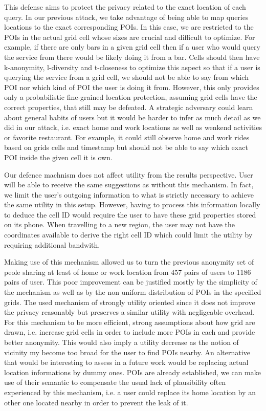 \documentclass[10pt,conference,compsocconf]{IEEEtran}
\begin{document}
This defense aims to protect the privacy related to the exact location of each query. In our previous attack, we take advantage of being able to map queries locations to the exact corresponding POIs. In this case, we are restricted to the POIs in the actual grid cell whose sizes are crucial and difficult to optimize. For example, if there are only bars in a given grid cell then if a user who would query the service from there would be likely doing it from a bar. Cells should then have k-anonymity, l-diversity and t-closeness to optimize this aspect so that if a user is querying the service from a grid cell, we should not be able to say from which POI nor which kind of POI the user is doing it from. However, this only provides only a probabilistic fine-grained location protection, assuming grid cells have the correct properties, that still may be defeated. A strategic adversary could learn about general habits of users but it would be harder to infer as much detail as we did in our attack, i.e. exact home and work locations as well as wenkend activities or favorite restaurant. For example, it could still observe home and work rides based on grids cells and timestamp but should not be able to say which exact POI inside the given cell it is own.

Our defence machnism does not affect utility from the results perspective. User will be able to receive the same suggestions as without this mechanism. In fact, we limit the user's outgoing information to what is strictly necessary to achieve the same utility in this setup. However, having to process this information locally to deduce the cell ID would require the user to have these grid properties stored on its phone. When travelling to a new region, the user may not have the coordinates available to derive the right cell ID which could limit the utility by requiring additional bandwith.

Making use of this mechanism allowed us to turn the previous anonymity set of peole sharing at least of home or work location from 457 pairs of users to 1186 pairs of user. This poor improvement can be justified mostly by the simplicity of the mechanism as well as by the non uniform distribution of POIs in the specified grids. The used mechanism of strongly utility oriented since it does not improve the privacy reasonably but preserves a similar utility with negligeable overhead. For this mechanism to be more efficient, strong assumptions about how grid are drawn, i.e. increase grid cells in order to include more POIs in each and provide better anonymity. This would also imply a utility decrease as the notion of vicinity my become too broad for the user to find POIs nearby. An alternative that would be interesting to assess in a future work would be replacing actual location informations by dummy ones. POIs are already established, we can make use of their semantic to compensate the usual lack of plausibility often experienced by this mechanism, i.e. a user could replace its home location by an other one located nearby in order to prevent the leak of it.
\end{document}
